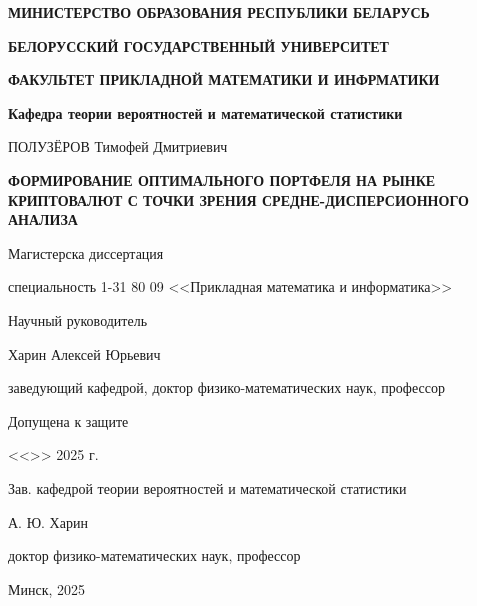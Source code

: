 \begin{titlepage}
    \begin{center}
       \textbf{МИНИСТЕРСТВО ОБРАЗОВАНИЯ РЕСПУБЛИКИ БЕЛАРУСЬ}

       \textbf{БЕЛОРУССКИЙ ГОСУДАРСТВЕННЫЙ УНИВЕРСИТЕТ}

       \textbf{ФАКУЛЬТЕТ ПРИКЛАДНОЙ МАТЕМАТИКИ И ИНФРМАТИКИ}

       \textbf{Кафедра теории вероятностей и математической статистики}
    \end{center}

    \vspace{15pt}

    \begin{center}
        ПОЛУЗЁРОВ Тимофей Дмитриевич
    \end{center}

    \begin{center}
        \textbf{ФОРМИРОВАНИЕ ОПТИМАЛЬНОГО ПОРТФЕЛЯ НА РЫНКЕ КРИПТОВАЛЮТ С ТОЧКИ ЗРЕНИЯ СРЕДНЕ-ДИСПЕРСИОННОГО АНАЛИЗА}
    \end{center}

    \begin{center}
        Магистерска диссертация

        специальность 1-31 80 09
        <<Прикладная математика и информатика>>
    \end{center}

    \vspace{10pt}

    \hfill
    \begin{minipage}{0.5\linewidth}
        \begin{flushleft}
            Научный руководитель
    
            Харин Алексей Юрьевич
    
            заведующий кафедрой, доктор физико-математических наук, профессор
    
        \end{flushleft}
    \end{minipage}

    \vspace{30pt}

    Допущена к защите

    <<\underline{\hspace{20pt}}>> \underline{\hspace{100pt}} 2025 г.

    Зав. кафедрой теории вероятностей и математической статистики

    \underline{\hspace{80pt}} А. Ю. Харин

    доктор физико-математических наук, профессор    

    \vspace{20pt}

    \begin{center}
        Минск, 2025
    \end{center}
\end{titlepage}
\setcounter{page}{2}